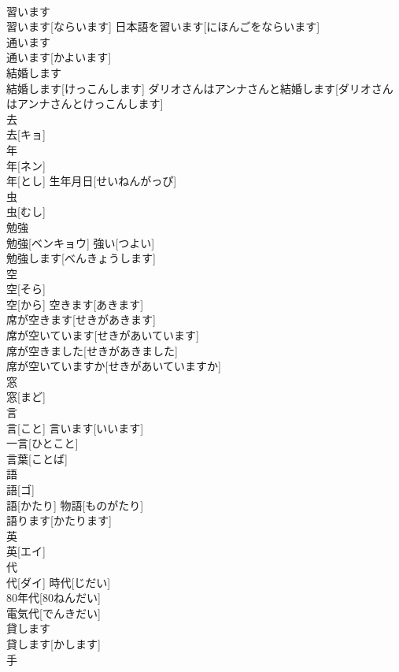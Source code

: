 \documentclass[8pt]{extreport}
\begin{document}
\begin{CJK}{UTF8}{min}
\\	習います	
\\	習います[ならいます]	日本語を習います[にほんごをならいます] 
\\	通います	
\\	通います[かよいます]	
\\	結婚します	
\\	結婚します[けっこんします]	ダリオさんはアンナさんと結婚します[ダリオさんはアンナさんとけっこんします] 
\\	去	
\\	去[キョ]	
\\	年	
\\	年[ネン] 
\\	年[とし]	生年月日[せいねんがっぴ] 
\\	虫	
\\	虫[むし]	
\\	勉強	
\\	勉強[ベンキョウ]	強い[つよい] 
\\	勉強します[べんきょうします] 
\\	空	
\\	空[そら] 
\\	空[から]	空きます[あきます] 
\\	席が空きます[せきがあきます] 
\\	席が空いています[せきがあいています] 
\\	席が空きました[せきがあきました] 
\\	席が空いていますか[せきがあいていますか] 
\\	窓	
\\	窓[まど]	
\\	言	
\\	言[こと]	言います[いいます] 
\\	一言[ひとこと] 
\\	言葉[ことば] 
\\	語	
\\	語[ゴ] 
\\	語[かたり]	物語[ものがたり] 
\\	語ります[かたります] 
\\	英	
\\	英[エイ]	
\\	代	
\\	代[ダイ]	時代[じだい] 
\\	80年代[80ねんだい] 
\\	電気代[でんきだい] 
\\	貸します	
\\	貸します[かします]	
\\	手	

\end{CJK}
\end{document}
